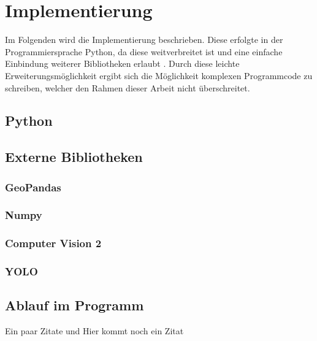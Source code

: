 \chapter{Implementierung}
\label{ch:implementierung}
{Im Folgenden wird die Implementierung beschrieben. Diese erfolgte in der Programmiersprache Python, da diese weitverbreitet ist und eine einfache Einbindung weiterer Bibliotheken erlaubt \citep{Millman2011}. Durch diese leichte Erweiterungsmöglichkeit ergibt sich die Möglichkeit komplexen Programmcode zu schreiben, welcher den Rahmen dieser Arbeit nicht überschreitet.

}

\section{Python}

\section{Externe Bibliotheken}
	\subsection{GeoPandas}
	\subsection{Numpy}
	\subsection{Computer Vision 2}
	\subsection{YOLO}
\section{Ablauf im Programm}{




	}
Ein paar Zitate \cite{Hartley2004} und \cite{Bishop2006} Hier kommt noch ein Zitat 
\cite{DorrChristopherH.2015SSBo}
\blindmathpaper



